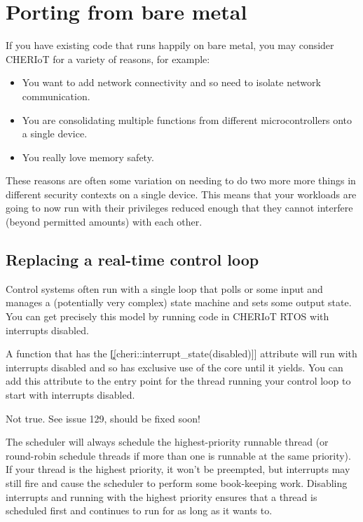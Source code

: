 \chapter{Porting from bare metal}

If you have existing code that runs happily on bare metal, you may consider CHERIoT for a variety of reasons, for example:

\begin{itemize}
	\item{You want to add network connectivity and so need to isolate network communication.}
	\item{You are consolidating multiple functions from different microcontrollers onto a single device.}
	\item{You really love memory safety.}
\end{itemize}

These reasons are often some variation on needing to do two more more things in different security contexts on a single device.
This means that your workloads are going to now run with their privileges reduced enough that they cannot interfere (beyond permitted amounts) with each other.

\section{Replacing a real-time control loop}

Control systems often run with a single loop that polls or some input and manages a (potentially very complex) state machine and sets some output state.
You can get precisely this model by running code in CHERIoT RTOS with interrupts disabled.

A function that has the \c{[[cheri::interrupt_state(disabled)]]} attribute will run with interrupts disabled and so has exclusive use of the core until it yields.
You can add this attribute to the entry point for the thread running your control loop to start with interrupts disabled.

\begin{warning}
Not true.
See issue 129, should be fixed soon! 
\end{warning}

The scheduler will always schedule the highest-priority runnable thread (or round-robin schedule threads if more than one is runnable at the same priority).
If your thread is the highest priority, it won't be preempted, but interrupts may still fire and cause the scheduler to perform some book-keeping work.
Disabling interrupts and running with the highest priority ensures that a thread is scheduled first and continues to run for as long as it wants to.

